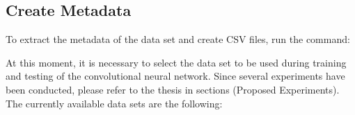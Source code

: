 \documentclass[letterpaper,10pt,english]{sphinxmanual}
\begin{document}
\subsection{Create Metadata}
\label{\detokenize{settings:create-metadata}}
To extract the metadata of the data set and create CSV files, run the command:

%
\begin{sphinxVerbatim}[commandchars=\\\{\}]
 
\end{sphinxVerbatim}

At this moment, it is necessary to select the data set to be used during training and testing
of the convolutional neural network. Since several experiments have been conducted, please refer
to the thesis in sections  (Proposed Experiments). The currently available data sets
are the following:
\end{document}
